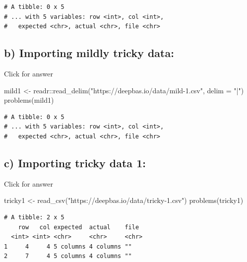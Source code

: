 \documentclass[
]{book}
\newenvironment{Shaded}{\begin{snugshade}}{\end{snugshade}}
\newcommand{\AttributeTok}[1]{\textcolor[rgb]{0.77,0.63,0.00}{#1}}
\newcommand{\FunctionTok}[1]{\textcolor[rgb]{0.00,0.00,0.00}{#1}}
\newcommand{\NormalTok}[1]{#1}
\newcommand{\OtherTok}[1]{\textcolor[rgb]{0.56,0.35,0.01}{#1}}
\newcommand{\SpecialCharTok}[1]{\textcolor[rgb]{0.00,0.00,0.00}{#1}}
\newcommand{\StringTok}[1]{\textcolor[rgb]{0.31,0.60,0.02}{#1}}
\begin{document}
\begin{verbatim}
# A tibble: 0 x 5
# ... with 5 variables: row <int>, col <int>,
#   expected <chr>, actual <chr>, file <chr>
\end{verbatim}

\hypertarget{b-importing-mildly-tricky-data}{%
\subsection{b) Importing mildly tricky data:}\label{b-importing-mildly-tricky-data}}

Click for answer

\begin{Shaded}
\begin{Highlighting}[]
\NormalTok{mild1 }\OtherTok{\textless{}{-}}\NormalTok{ readr}\SpecialCharTok{::}\FunctionTok{read\_delim}\NormalTok{(}\StringTok{"https://deepbas.io/data/mild{-}1.csv"}\NormalTok{, }\AttributeTok{delim =} \StringTok{"|"}\NormalTok{)}
\FunctionTok{problems}\NormalTok{(mild1)}
\end{Highlighting}
\end{Shaded}

\begin{verbatim}
# A tibble: 0 x 5
# ... with 5 variables: row <int>, col <int>,
#   expected <chr>, actual <chr>, file <chr>
\end{verbatim}

\hypertarget{c-importing-tricky-data-1}{%
\subsection{c) Importing tricky data 1:}\label{c-importing-tricky-data-1}}

Click for answer

\begin{Shaded}
\begin{Highlighting}[]
\NormalTok{tricky1 }\OtherTok{\textless{}{-}}  \FunctionTok{read\_csv}\NormalTok{(}\StringTok{"https://deepbas.io/data/tricky{-}1.csv"}\NormalTok{)}
\FunctionTok{problems}\NormalTok{(tricky1)}
\end{Highlighting}
\end{Shaded}

\begin{verbatim}
# A tibble: 2 x 5
    row   col expected  actual    file 
  <int> <int> <chr>     <chr>     <chr>
1     4     4 5 columns 4 columns ""   
2     7     4 5 columns 4 columns ""   
\end{verbatim}
\end{document}
